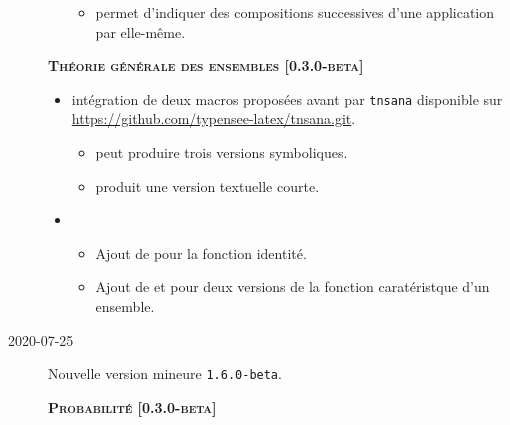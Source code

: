 \documentclass[12pt,a4paper]{book}
\begin{document}
\begin{description}
\begin{itemize}[itemsep=.5em]
\begin{itemize}[itemsep=.5em]
            \item {} permet d'indiquer des compositions successives d'une application par elle-même.
        \end{itemize}
    \end{itemize}
    
    
    \begin{center}
        \textbf{\textsc{Théorie générale des ensembles [0.3.0-beta]}}
    \end{center}
    
    \begin{itemize}[itemsep=.5em]
        \item {}
              intégration de deux macros proposées avant par \verb#tnsana# disponible sur \url{https://github.com/typensee-latex/tnsana.git}.
    
        \begin{itemize}[itemsep=.5em]
            \item {} peut produire trois versions symboliques.
    
            \item {} produit une version textuelle courte.
        \end{itemize}
    
    
        \item {}
    
        \begin{itemize}[itemsep=.5em]
            \item Ajout de  pour la fonction identité.
    
            \item Ajout de  et  pour deux versions de la fonction caratéristque d'un ensemble.
        \end{itemize}
    \end{itemize}
    
    
    \separation


    \medskip
    \item[2020-07-25] Nouvelle version mineure \verb+1.6.0-beta+.
    
    
    
    
    \begin{center}
        \textbf{\textsc{Probabilité [0.3.0-beta]}}
    \end{center}
    

\end{description}
\end{document}
